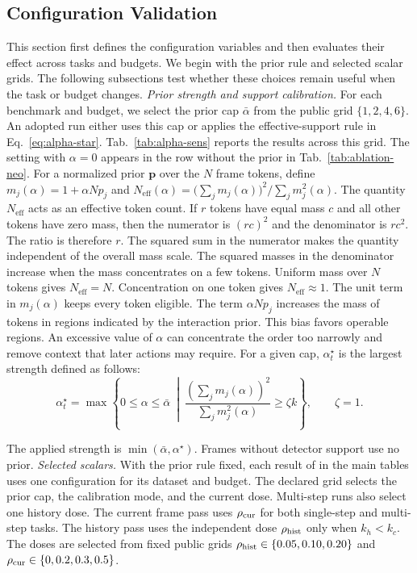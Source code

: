 \subsection{Configuration Validation}
\label{app:hyper}
This section first defines the configuration variables and then evaluates their effect across tasks and budgets.
%
We begin with the prior rule and selected scalar grids.
%
The following subsections test whether these choices remain useful when the task or budget changes.
%
\noindent\textit{Prior strength and support calibration.}
\label{app:alpha}
For each benchmark and budget, we select the prior cap $\bar{\alpha}$ from the public grid $\{1,2,4,6\}$.
%
An adopted run either uses this cap or applies the effective-support rule in Eq.~\ref{eq:alpha-star}.
%
Tab.~\ref{tab:alpha-sens} reports the results across this grid.
%
The setting with $\alpha=0$ appears in the row without the prior in Tab.~\ref{tab:ablation-neo}.
%
For a normalized prior $\mathbf p$ over the $N$ frame tokens, define
$m_j(\alpha)=1+\alpha Np_j$ and
$N_{\mathrm{eff}}(\alpha)=\bigl(\sum_j m_j(\alpha)\bigr)^2\!/\sum_j m_j^2(\alpha)$.
%
The quantity $N_{\mathrm{eff}}$ acts as an effective token count.
%
If $r$ tokens have equal mass $c$ and all other tokens have zero mass, then
%
the numerator is $(rc)^2$ and the denominator is $rc^2$.
%
The ratio is therefore $r$.
%
The squared sum in the numerator makes the quantity independent of the overall mass scale.
%
The squared masses in the denominator increase when the mass concentrates on a few tokens.
%
Uniform mass over $N$ tokens gives $N_{\mathrm{eff}}=N$.
%
Concentration on one token gives $N_{\mathrm{eff}}\approx1$.
%
The unit term in $m_j(\alpha)$ keeps every token eligible.
%
The term $\alpha Np_j$ increases the mass of tokens in regions indicated by the interaction prior.
%
This bias favors operable regions.
%
An excessive value of $\alpha$ can concentrate the order too narrowly and remove context that later actions may require.
%
For a given cap, $\alpha_t^\star$ is the largest strength defined as follows:
\begin{equation}
\alpha_t^\star
=
\max\left\{
0\leq\alpha\leq\bar{\alpha}
\ \middle|\
\frac{\left(\sum_j m_j(\alpha)\right)^2}{\sum_j m_j^2(\alpha)}
\geq \zeta k
\right\},
\qquad \zeta=1 .
\label{eq:alpha-star}
\end{equation}

The applied strength is $\min(\bar{\alpha},\alpha^{\star})$.
%
Frames without detector support use no prior.
%
\noindent\textit{Selected scalars.}
With the prior rule fixed, each result of \method{} in the main tables uses one configuration for its dataset and budget.
%
The declared grid selects the prior cap, the calibration mode, and the current dose.
%
Multi-step runs also select one history dose.
%
The current frame pass uses $\rho_{\mathrm{cur}}$ for both single-step and multi-step tasks.
%
The history pass uses the independent dose $\rho_{\mathrm{hist}}$ only when $k_h<k_c$.
%
The doses are selected from fixed public grids $\rho_{\mathrm{hist}}\in\{0.05,0.10,0.20\}$ and $\rho_{\mathrm{cur}}\in\{0,0.2,0.3,0.5\}$.

